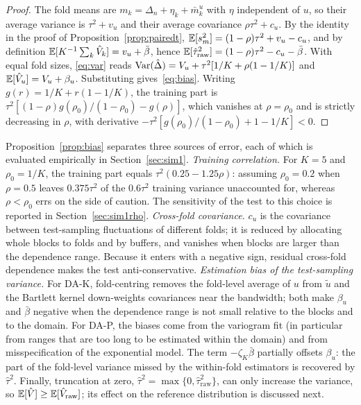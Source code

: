 \begin{proof}
The fold means are $m_k=\Delta_n+\eta_k+\bar m^u_k$ with $\eta$ independent of $u$, so their average variance is $\tau^2+v_u$ and their average covariance $\rho\tau^2+c_u$. By the identity in the proof of Proposition~\ref{prop:pairedt}, $\mathbb{E}[s_m^2]=(1-\rho)\tau^2+v_u-c_u$, and by definition $\mathbb{E}[K^{-1}\sum_k\hat V_k]=v_u+\bar\beta$, hence $\mathbb{E}[\hat\tau^2_{\mathrm{raw}}]=(1-\rho)\tau^2-c_u-\bar\beta$. With equal fold sizes, \eqref{eq:var} reads $\operatorname{Var}(\hat\Delta)=V_u+\tau^2[1/K+\rho(1-1/K)]$ and $\mathbb{E}[\hat V_u]=V_u+\beta_u$. Substituting gives~\eqref{eq:bias}. Writing $g(r)=1/K+r(1-1/K)$, the training part is $\tau^2[(1-\rho)g(\rho_0)/(1-\rho_0)-g(\rho)]$, which vanishes at $\rho=\rho_0$ and is strictly decreasing in $\rho$, with derivative $-\tau^2[g(\rho_0)/(1-\rho_0)+1-1/K]<0$.
\end{proof}

Proposition~\ref{prop:bias} separates three sources of error, each of which is evaluated empirically in Section~\ref{sec:sim1}. \emph{Training correlation.} For $K=5$ and $\rho_0=1/K$, the training part equals $\tau^2(0.25-1.25\rho)$: assuming $\rho_0=0.2$ when $\rho=0.5$ leaves $0.375\tau^2$ of the $0.6\tau^2$ training variance unaccounted for, whereas $\rho<\rho_0$ errs on the side of caution. The sensitivity of the test to this choice is reported in Section~\ref{sec:sim1rho}. \emph{Cross-fold covariance.} $c_u$ is the covariance between test-sampling fluctuations of different folds; it is reduced by allocating whole blocks to folds and by buffers, and vanishes when blocks are larger than the dependence range. Because it enters with a negative sign, residual cross-fold dependence makes the test anti-conservative. \emph{Estimation bias of the test-sampling variance.} For DA-K, fold-centring removes the fold-level average of $u$ from $\tilde u$ and the Bartlett kernel down-weights covariances near the bandwidth; both make $\beta_u$ and $\bar\beta$ negative when the dependence range is not small relative to the blocks and to the domain. For DA-P, the biases come from the variogram fit (in particular from ranges that are too long to be estimated within the domain) and from misspecification of the exponential model. The term $-\zeta_K\bar\beta$ partially offsets $\beta_u$: the part of the fold-level variance missed by the within-fold estimators is recovered by $\hat\tau^2$. Finally, truncation at zero, $\hat\tau^2=\max\{0,\hat\tau^2_{\mathrm{raw}}\}$, can only increase the variance, so $\mathbb{E}[\hat V]\ge\mathbb{E}[\hat V_{\mathrm{raw}}]$; its effect on the reference distribution is discussed next.

